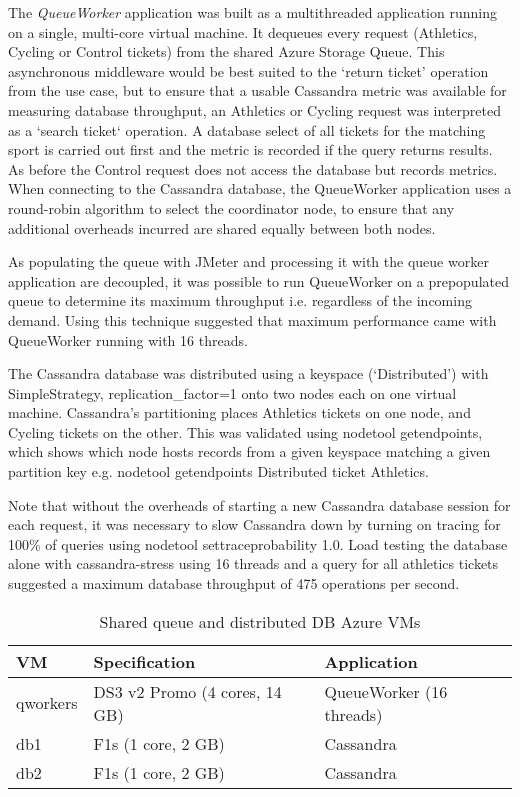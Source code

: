 The {\itshape QueueWorker} application was built as a multithreaded application running on a single, multi-core virtual machine.  It dequeues every request (Athletics, Cycling or Control tickets) from the shared Azure Storage Queue.  This asynchronous middleware would be best suited to the `return ticket' operation from the use case, but to ensure that a usable Cassandra metric was available for measuring database throughput, an Athletics or Cycling request was interpreted as a `search ticket` operation.  A database select of all tickets for the matching sport is carried out first and the metric is recorded if the query returns results.  As before the Control request does not access the database but records metrics.  When connecting to the Cassandra database, the QueueWorker application uses a round-robin algorithm to select the coordinator node, to ensure that any additional overheads incurred are shared equally between both nodes.

As populating the queue with JMeter and processing it with the queue worker application are decoupled, it was possible to run QueueWorker on a prepopulated queue to determine its maximum throughput i.e. regardless of the incoming demand.  Using this technique suggested that maximum performance came with QueueWorker running with 16 threads.

The Cassandra database was distributed using a keyspace (`Distributed') with SimpleStrategy, replication\_factor=1 onto two nodes each on one virtual machine.  Cassandra's partitioning places Athletics tickets on one node, and Cycling tickets on the other.  This was validated using nodetool getendpoints, which shows which node hosts records from a given keyspace matching a given partition key e.g. nodetool getendpoints Distributed ticket Athletics.

Note that without the overheads of starting a new Cassandra database session for each request, it was necessary to slow Cassandra down by turning on tracing for 100\% of queries using nodetool settraceprobability 1.0.  Load testing the database alone with cassandra-stress using 16 threads and a query for all athletics tickets suggested a maximum database throughput of 475 operations per second.

\begin{table}[h!]
	\centering
	\caption{Shared queue and distributed DB Azure VMs}
	\label{table:builtddnr_vmdesign}
	\begin{tabular}{l | l | l}
		VM		& Specification			& Application \\
		\hline
		qworkers	& DS3 v2 Promo (4 cores, 14 GB)	& QueueWorker (16 threads) \\
		db1		& F1s (1 core, 2 GB)		& Cassandra \\
		db2		& F1s (1 core, 2 GB)		& Cassandra \\
	\end{tabular}
\end{table}

